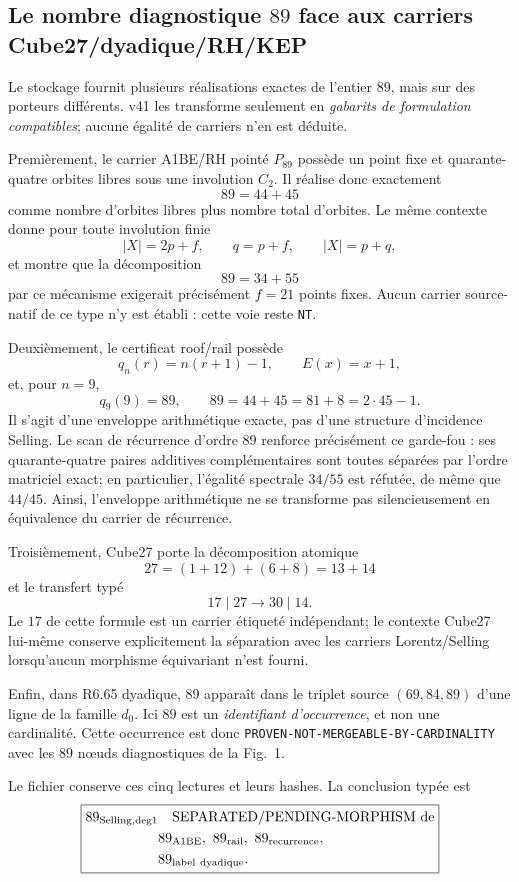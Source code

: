 \documentclass[11pt,a4paper]{article}
\newcommand{\certNT}{\texttt{NT}}
\begin{document}
\subsection{Le nombre diagnostique $89$ face aux carriers Cube27/dyadique/RH/KEP}

Le stockage fournit plusieurs réalisations exactes de l'entier $89$, mais sur des porteurs différents. v41 les transforme seulement en \emph{gabarits de formulation compatibles}; aucune égalité de carriers n'en est déduite.

Premièrement, le carrier A1BE/RH pointé $P_{89}$ possède un point fixe et quarante-quatre orbites libres sous une involution $C_2$. Il réalise donc exactement
\[
 \boxed{89=44+45}
\]
comme nombre d'orbites libres plus nombre total d'orbites. Le même contexte donne pour toute involution finie
\[
 |X|=2p+f,\qquad q=p+f,\qquad |X|=p+q,
\]
et montre que la décomposition
\[
 \boxed{89=34+55}
\]
par ce mécanisme exigerait précisément $f=21$ points fixes. Aucun carrier source-natif de ce type n'y est établi : cette voie reste \certNT.

Deuxièmement, le certificat roof/rail possède
\[
 q_n(r)=n(r+1)-1,
 \qquad E(x)=x+1,
\]
et, pour $n=9$,
\[
 \boxed{q_9(9)=89,
 \qquad89=44+45=81+8=2\cdot45-1.}
\]
Il s'agit d'une enveloppe arithmétique exacte, pas d'une structure d'incidence Selling. Le scan de récurrence d'ordre $89$ renforce précisément ce garde-fou : ses quarante-quatre paires additives complémentaires sont toutes séparées par l'ordre matriciel exact; en particulier, l'égalité spectrale $34/55$ est réfutée, de même que $44/45$. Ainsi, l'enveloppe arithmétique ne se transforme pas silencieusement en équivalence du carrier de récurrence.

Troisièmement, Cube27 porte la décomposition atomique
\[
 27=(1+12)+(6+8)=13+14
\]
et le transfert typé
\[
 \boxed{17\mid27\longrightarrow30\mid14.}
\]
Le $17$ de cette formule est un carrier étiqueté indépendant; le contexte Cube27 lui-même conserve explicitement la séparation avec les carriers Lorentz/Selling lorsqu'aucun morphisme équivariant n'est fourni.

Enfin, dans R6.65 dyadique, $89$ apparaît dans le triplet source $(69,84,89)$ d'une ligne de la famille $d_0$. Ici $89$ est un \emph{identifiant d'occurrence}, et non une cardinalité. Cette occurrence est donc \texttt{PROVEN-NOT-MERGEABLE-BY-CARDINALITY} avec les $89$ nœuds diagnostiques de la Fig.~1.

Le fichier  conserve ces cinq lectures et leurs hashes. La conclusion typée est
\[
 \boxed{\begin{aligned}
 89_{\rm Selling,deg1}
 &\quad\text{SEPARATED/PENDING-MORPHISM de}\\
 &89_{\rm A1BE},\ 89_{\rm rail},\ 89_{\rm recurrence},\\
 &89_{\rm label\ dyadique}.
 \end{aligned}}
\]
\end{document}
